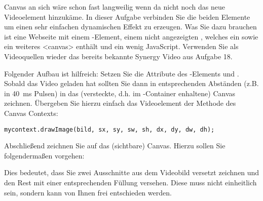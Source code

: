 %
\par Canvas an sich wäre schon fast langweilig wenn da nicht noch das neue
Videoelement hinzukäme. In dieser Aufgabe verbinden Sie die beiden Elemente um
einen sehr einfachen dynamischen Effekt zu erzeugen. Was Sie dazu brauchen ist
eine Webseite mit einem -Element, einem nicht angezeigten
, welches ein  sowie ein weiteres <canvas> enthält und
ein wenig JavaScript. Verwenden Sie als Videoquellen wieder das bereits
bekannte Synergy Video aus Aufgabe 18.
%
\par Folgender Aufbau ist hilfreich: Setzen Sie die Attribute des
-Elements  und . Sobald das
Video geladen hat sollten Sie dann in entsprechenden Abständen (z.B. in
\qty{40}{ms} Pulsen) in das (versteckte, d.h. im -Container
enhaltene) Canvas zeichnen. Übergeben Sie hierzu einfach das Videoelement der
 Methode des Canvas Contexts:
%
\begin{lstlisting}
mycontext.drawImage(bild, sx, sy, sw, sh, dx, dy, dw, dh);
\end{lstlisting}
%
\par Abschließend zeichnen Sie auf das (sichtbare) Canvas. Hierzu sollen Sie
folgendermaßen vorgehen:
%


\par Dies bedeutet, dass Sie zwei Ausschnitte aus dem Videobild versetzt
zeichnen und den Rest mit einer entsprechenden Füllung versehen. Diese muss
nicht einheitlich sein, sondern kann von Ihnen frei entschieden werden.